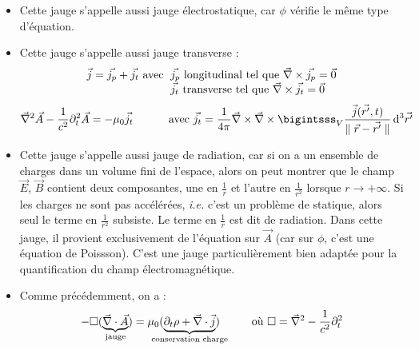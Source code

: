	
	\begin{remarks}\hspace{1pt}
		\begin{itemize}
			\item Cette jauge s'appelle aussi jauge électrostatique, car $\phi$ vérifie le même type d'équation.
			\item Cette jauge s'appelle aussi jauge transverse :
$$
	\begin{array}{r@{\;}l}
					\vec{j}=\vec{j_p}+\vec{j_t} \text{ avec }&\vec{j_p} \text{ longitudinal tel que } \nab\times\vec{j_p}=\vec{0}\\
					&\vec{j_t} \text{ transverse tel que } \nab\times\vec{j_t}=\vec{0}
	\end{array}
$$
$$
			\nab^2\vec{A}-\frac{1}{c^2}\partial_t^2\vec{A}=-\mu_0\vec{j_t}\\
			\text{\hspace{1cm} avec }\vec{j_t}=\frac{1}{4\pi}\nab\times\nab\times\bigintsss_V\frac{\vec{j}(\vec{r'},t)}{\parallel\vec{r}-\vec{r'}\parallel}\,\dif^3\vec{r'}
$$
			\item {\txt Cette jauge s'appelle aussi jauge de radiation, car si on a un ensemble de charges dans un volume fini de l'espace, alors on peut montrer que le champ $\vec{E}$, $\vec{B}$ contient deux composantes, une en $\frac{1}{r}$ et l'autre en $\frac{1}{r^2}$ lorsque $r\rightarrow+\infty$. Si les charges ne sont pas accélérées, \emph{i.e.} c'est un problème de statique, alors seul le terme en $\frac{1}{r^2}$ subsiste. Le terme en $\frac{1}{r}$ est dit de radiation. Dans cette jauge, il provient exclusivement de l'équation sur $\vec{A}$ (car sur $\phi$, c'est une équation de Poissson). C'est une jauge particulièrement bien adaptée pour la quantification du champ électromagnétique.}
			\item Comme précédemment, on a :
$$
	-\square(\underbrace{\nab\cdot\vec{A}}_{\text{jauge}})=
	\mu_0(\underbrace{\partial_t\rho+\nab\cdot\vec{j}}_{\mathclap{\text{conservation  charge}}})\text{\hspace{1cm}où }\square=\nab^2-\frac{1}{c^2}\partial_t^2
$$
		\end{itemize}
	\end{remarks}